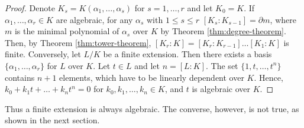 \begin{proof}
    Denote $K_s = K(\alpha_1, \dots, \alpha_s)$ for $s = 1, \dots, r$ and let $K_0 = K$. If \(\alpha_1, \dots , \alpha_r \in K\) are algebraic, for any \(\alpha_s\) with \(1 \leq s \leq r\) \( [K_s: K_{s-1}] = \partial m\), where \(m\) is the minimal polynomial of \(\alpha_s\) over \(K\) by Theorem \ref{thm:degree-theorem}. Then, by Theorem \ref{thm:tower-theorem}, \([K_r : K] = [K_r:K_{r-1}]\dots[K_1:K]\) is finite. Conversely, let \(L/K\) be a finite extension. Then there exists a basis \(\{\alpha_1, \dots, \alpha_r\}\) for \(L\) over \(K\). Let \(t \in L\)  and let \(n = [L:K]\). The set \(\{1,t,\dots,t^n\}\) contains \(n+1\) elements, which have to be linearly dependent over \(K\). Hence, \(k_0 + k_1 t + \dots + k_n t^n = 0\) for \(k_0, k_1, \dots, k_n \in K\), and \(t\) is algebraic over \(K\).
\end{proof}

Thus a finite extension is always algebraic. The converse, however, is not true, as shown in the next section. 



